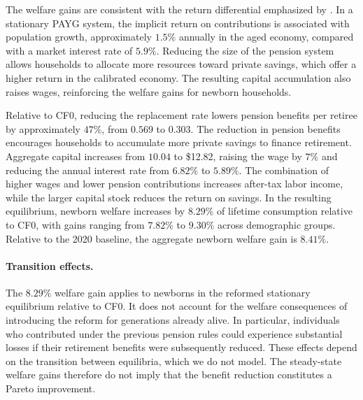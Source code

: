 \documentclass[12pt,a4paper]{article}
\begin{document}
The welfare gains are consistent with the return differential emphasized by \citet{Aaron1966}. In a stationary PAYG system, the implicit return on contributions is associated with population growth, approximately $1.5\%$ annually in the aged economy, compared with a market interest rate of $5.9\%$. Reducing the size of the pension system allows households to allocate more resources toward private savings, which offer a higher return in the calibrated economy. The resulting capital accumulation also raises wages, reinforcing the welfare gains for newborn households.

Relative to CF0, reducing the replacement rate lowers pension benefits per retiree by approximately $47\%$, from $0.569$ to $0.303$. The reduction in pension benefits encourages households to accumulate more private savings to finance retirement. Aggregate capital increases from $10.04$ to \$12.82, raising the wage by $7\%$ and reducing the annual interest rate from $6.82\%$ to $5.89\%$. The combination of higher wages and lower pension contributions increases after-tax labor income, while the larger capital stock reduces the return on savings. In the resulting equilibrium, newborn welfare increases by $8.29\%$ of lifetime consumption relative to CF0, with gains ranging from $7.82\%$ to $9.30\%$ across demographic groups. Relative to the 2020 baseline, the aggregate newborn welfare gain is $8.41\%$.

\paragraph{Transition effects.}
The $8.29\%$ welfare gain applies to newborns in the reformed stationary equilibrium relative to CF0. It does not account for the welfare consequences of introducing the reform for generations already alive. In particular, individuals who contributed under the previous pension rules could experience substantial losses if their retirement benefits were subsequently reduced. These effects depend on the transition between equilibria, which we do not model. The steady-state welfare gains therefore do not imply that the benefit reduction constitutes a Pareto improvement.
\end{document}
